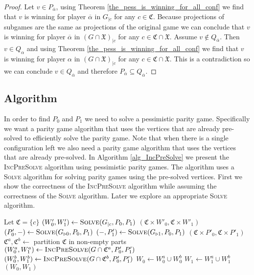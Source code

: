 \begin{lemma}
\begin{proof}
		
		Let $v \in P_{\overline{\alpha}}$, using Theorem \ref{the_pess_is_winning_for_all_conf} we find that $v$ is winning for player $\overline{\alpha}$ in $G_{|c}$ for any $c \in \mathfrak{C}$. Because projections of subgames are the same as projections of the original game we can conclude that $v$ is winning for player $\overline{\alpha}$ in $(G \cap \mathfrak{X})_{|c}$ for any $c \in \mathfrak{C} \cap \mathfrak{X}$.	Assume $v \notin Q_{\overline{\alpha}}$. Then $v \in Q_{\alpha}$ and using Theorem \ref{the_pess_is_winning_for_all_conf} we find that $v$ is winning for player $\alpha$ in $(G \cap \mathfrak{X})_{|c}$ for any $c \in \mathfrak{C} \cap \mathfrak{X}$. This is a contradiction so we can conclude $v \in Q_{\overline{\alpha}}$ and therefore $P_{\overline{\alpha}} \subseteq Q_{\overline{\alpha}}$.
	\end{proof}
\end{lemma}
\subsection{Algorithm}
In order to find $P_0$ and $P_1$ we need to solve a pessimistic parity game. Specifically we want a parity game algorithm that uses the vertices that are already pre-solved to efficiently solve the parity game. Note that when there is a single configuration left we also need a parity game algorithm that uses the vertices that are already pre-solved. In Algorithm \ref{alg_IncPreSolve} we present the \textsc{IncPreSolve} algorithm using pessimistic parity games. The algorithm uses a \textsc{Solve} algorithm for solving parity games using the pre-solved vertices. First we show the correctness of the \textsc{IncPreSolve} algorithm while assuming the correctness of the \textsc{Solve} algorithm. Later we explore an appropriate \textsc{Solve} algorithm.
\begin{algorithm}
	\caption{$\textsc{IncPreSolve}(G = (V,V_0,V_1, E, \Omega, \mathfrak{C}, \theta), P_0,P_1)$}\label{alg_IncPreSolve}
	\begin{algorithmic}[1]
		\State Let $\mathfrak{C} = \{c\}$
		\State $(W'_0,W'_1) \gets \textsc{Solve}(G_{|c}, P_0,P_1)$
		\State \Return $(\mathfrak{C} \times W'_0, \mathfrak{C} \times W'_1)$
		\EndIf
		\State $(P'_0,-) \gets \textsc{Solve}(G_{\triangleright0}, P_0, P_1)$
		\State $(-,P'_1) \gets \textsc{Solve}(G_{\triangleright1}, P_0, P_1)$
		\State \Return $(\mathfrak{C} \times P'_0, \mathfrak{C} \times P'_1)$
		\EndIf
		\State $\mathfrak{C}^a, \mathfrak{C}^b \gets $ partition $\mathfrak{C}$ in non-empty parts
		\State $(W_0^a, W_1^a) \gets \textsc{IncPreSolve}(G \cap \mathfrak{C}^a, P'_0,P'_1)$
		\State $(W_0^b, W_1^b) \gets \textsc{IncPreSolve}(G \cap \mathfrak{C}^b, P'_0,P'_1)$
		\State $W_0 \gets W_0^a \cup W_0^b$
		\State $W_1 \gets W_1^a \cup W_1^b$
		\State \Return $(W_0,W_1)$
	\end{algorithmic}
\end{algorithm}

